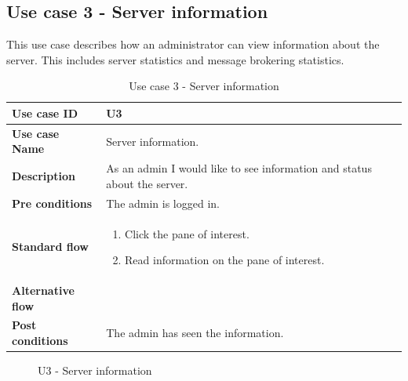 \subsection{Use case 3 - Server information}

This use case describes how an administrator can view information about the server. This includes server statistics and message brokering statistics. 

\begin{table}[ht!]
\centering
\begin{tabular}{|l|p{5cm}|}
\hline
\textbf{Use case ID} & U3 \\ \hline
\textbf{Use case Name} & Server information. \\ \hline
\textbf{Description} & As an admin I would like to see information and status about the server.  \\ \hline
\textbf{Pre conditions} & The admin is logged in.\\ \hline
\textbf{Standard flow} & \begin{enumerate}
\item Click the pane of interest.
\item Read information on the pane of interest.  
\end{enumerate} \\ \hline
\textbf{Alternative flow} & \\ \hline
\textbf{Post conditions} & The admin has seen the information. \\ \hline
\end{tabular}
\caption{Use case 3 - Server information}
\label{uc3}
\end{table}

\begin{center}
  \begin{figure}[ht!]
    \caption{U3 - Server information}
    \label{fig:u3}
  \end{figure}
\end{center}

